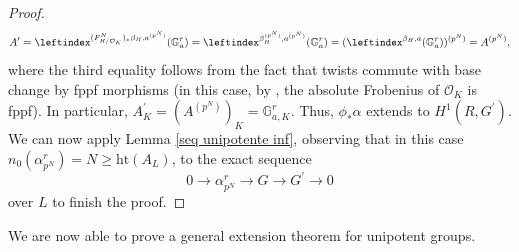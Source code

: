 \documentclass[a4paper,english,12pt]{amsart}
\numberwithin{equation}{section}
\renewcommand{\geq}{\geqslant}
\renewcommand{\_}{\rule{0.25cm}{0.4pt}}
\begin{document}
\begin{proof}
    \[
    A^{\prime}=\leftindex^{(F_{H/\mathcal{O}_{K}}^{N})_{\ast}\beta_{H},a^{(p^{N})}}(\mathbb{G}_{a}^{r})=\leftindex^{\beta_{H}^{(p^{N})},a^{(p^{N})}}(\mathbb{G}_{a}^{r})=(\leftindex^{\beta_{H},a}(\mathbb{G}_{a}^{r}))^{(p^{N})}=A^{(p^{N})},
    \]
    where the third equality follows from the fact that twists commute with base change by fppf morphisms (in this case, by \cite[\href{https://stacks.math.columbia.edu/tag/0EC0}{Tag 0EC0}]{stacks-project}, the absolute Frobenius of $\mathcal{O}_{K}$ is fppf). In particular, $A^{\prime}_{K}=(A^{(p^{N})})_{K}=\mathbb{G}_{a,K}^{r}$. Thus, $\phi_{\ast}\alpha$ extends to $H^{1}(R,G^{\prime})$. We can now apply Lemma \ref{seq unipotente inf}, observing that in this case $n_{0}(\alpha_{p^{N}}^{r})=N\geq \text{ht}(A_{L})$, to the exact sequence
    \[
    0\to \alpha_{p^{N}}^{r}\to G\to G^{\prime}\to 0
    \]
    over $L$ to finish the proof.
\end{proof}

We are now able to prove a general extension theorem for unipotent groups.
\end{document}
